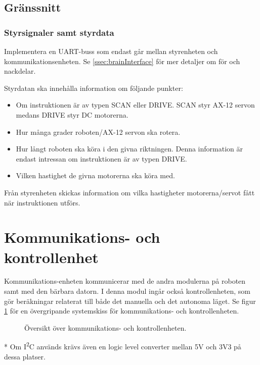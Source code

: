 \documentclass[a4paper,11pt]{article}
\begin{document}
\subsection{Gränssnitt} \label{ssec:controlInterface}

\subsubsection{Styrsignaler samt styrdata}
Implementera en UART-buss som endast går mellan styrenheten och kommunikationsenheten. Se \ref{ssec:brainInterface} för mer detaljer om för och nackdelar.

Styrdatan ska innehålla information om följande punkter:
\begin{itemize}
	\item Om instruktionen är av typen SCAN eller DRIVE. SCAN styr AX-12 servon medans DRIVE styr DC motorerna.
	\item Hur många grader roboten/AX-12 servon ska rotera.
	\item Hur långt roboten ska köra i den givna riktningen. Denna information är endast intressan om instruktionen är av typen DRIVE.
	\item Vilken hastighet de givna motorerna ska köra med.
\end{itemize}

Från styrenheten skickas information om vilka hastigheter motorerna/servot fått när instruktionen utförs.

\newpage
\section{Kommunikations- och kontrollenhet} \label{sec:system3}
Kommunikations-enheten kommunicerar med de andra modulerna på roboten samt med den bärbara datorn. I denna modul ingår också kontrollenheten, som gör beräkningar relaterat till både det manuella och det autonoma läget. Se figur \ref{fig:unitBrain} för en övergripande systemskiss för kommunikations- och kontrollenheten.
\begin{figure}[h!]
    \caption{Översikt över kommunikations- och kontrollenheten.  }
    \label{fig:unitBrain}
\end{figure}
\noindent \begin{small}
* Om I\textsuperscript{2}C används krävs även en logic level converter mellan 5V och 3V3 på dessa platser.
\end{small}
\end{document}
